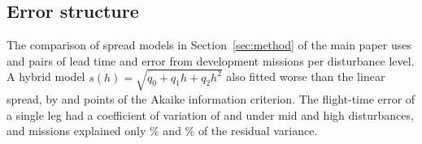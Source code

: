 \subsection{Error structure}
The comparison of spread models in Section~\ref{sec:method} of the main paper uses  and
 pairs of lead time and error from  development missions per disturbance level. A
hybrid model $s(h)=\sqrt{q_0+q_1h+q_2h^2}$ also fitted worse than the linear spread, by  and
 points of the Akaike information criterion. The flight-time error of a single leg had a coefficient of
variation of  and  under mid and high disturbances, and missions explained only
\% and \% of the residual variance.

